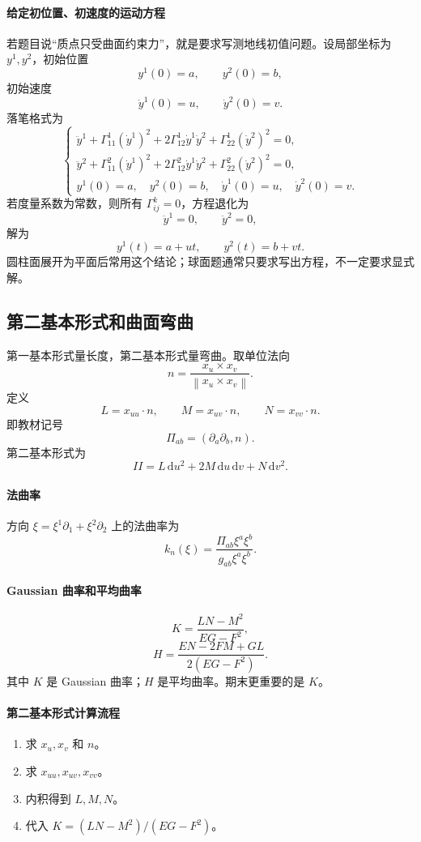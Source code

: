 \documentclass[UTF8,12pt,a4paper]{ctexart}
\newcommand{\dd}{\,\mathrm d}
\newcommand{\norm}[1]{\left\lVert #1\right\rVert}
\begin{document}
\paragraph{给定初位置、初速度的运动方程}
若题目说“质点只受曲面约束力”，就是要求写测地线初值问题。设局部坐标为 $y^1,y^2$，初始位置
\[
y^1(0)=a,\qquad y^2(0)=b,
\]
初始速度
\[
\dot y^1(0)=u,\qquad \dot y^2(0)=v.
\]
落笔格式为
\[
\begin{cases}
\ddot y^1+\Gamma^1_{11}(\dot y^1)^2+2\Gamma^1_{12}\dot y^1\dot y^2+\Gamma^1_{22}(\dot y^2)^2=0,\\
\ddot y^2+\Gamma^2_{11}(\dot y^1)^2+2\Gamma^2_{12}\dot y^1\dot y^2+\Gamma^2_{22}(\dot y^2)^2=0,\\
y^1(0)=a,\quad y^2(0)=b,\quad \dot y^1(0)=u,\quad \dot y^2(0)=v.
\end{cases}
\]
若度量系数为常数，则所有 $\Gamma^k_{ij}=0$，方程退化为
\[
\ddot y^1=0,\qquad \ddot y^2=0,
\]
解为
\[
y^1(t)=a+ut,\qquad y^2(t)=b+vt.
\]
圆柱面展开为平面后常用这个结论；球面题通常只要求写出方程，不一定要求显式解。

\subsection{第二基本形式和曲面弯曲}

第一基本形式量长度，第二基本形式量弯曲。取单位法向
\[
n=\frac{x_u\times x_v}{\norm{x_u\times x_v}}.
\]
定义
\[
L=x_{uu}\cdot n,\qquad M=x_{uv}\cdot n,\qquad N=x_{vv}\cdot n.
\]
即教材记号
\[
\Pi_{ab}=(\partial_a\partial_b,n).
\]
第二基本形式为
\[
II=L\dd u^2+2M\dd u\dd v+N\dd v^2.
\]

\paragraph{法曲率}
方向 $\xi=\xi^1\partial_1+\xi^2\partial_2$ 上的法曲率为
\[
k_n(\xi)=\frac{\Pi_{ab}\xi^a\xi^b}{g_{ab}\xi^a\xi^b}.
\]

\paragraph{Gaussian 曲率和平均曲率}
\[
K=\frac{LN-M^2}{EG-F^2},
\]
\[
H=\frac{EN-2FM+GL}{2(EG-F^2)}.
\]
其中 $K$ 是 Gaussian 曲率；$H$ 是平均曲率。期末更重要的是 $K$。

\paragraph{第二基本形式计算流程}
\begin{enumerate}
\item 求 $x_u,x_v$ 和 $n$。
\item 求 $x_{uu},x_{uv},x_{vv}$。
\item 内积得到 $L,M,N$。
\item 代入 $K=(LN-M^2)/(EG-F^2)$。
\end{enumerate}
\end{document}
